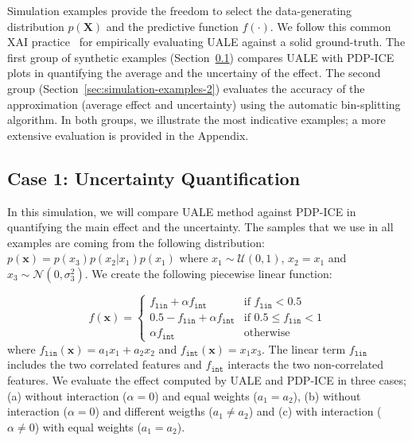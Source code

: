 \documentclass[twoside]{article}
\begin{document}
Simulation examples provide the freedom to select the data-generating
distribution \(p(\mathbf{X})\) and the predictive function
\(f(\cdot)\). We follow this common XAI
practice~\citep{aas2021explaining, herbinger2022repid} for empirically
evaluating UALE against a solid ground-truth. The first group of
synthetic examples (Section~\ref{sec:simulation-examples-1}) compares
UALE with PDP-ICE plots in quantifying the average and the uncertainy
of the effect. The second group
(Section~\ref{sec:simulation-examples-2}) evaluates the accuracy of
the approximation (average effect and uncertainty) using the automatic
bin-splitting algorithm. In both groups, we illustrate the most
indicative examples; a more extensive evaluation is provided in the
Appendix.

\subsection{Case 1: Uncertainty Quantification}
\label{sec:simulation-examples-1}

In this simulation, we will compare UALE method against PDP-ICE in
quantifying the main effect and the uncertainty. The samples that we
use in all examples are coming from the following distribution:
\(p(\mathbf{x}) = p(x_3)p(x_2|x_1)p(x_1)\) where
\(x_1 \sim \mathcal{U}(0,1)\), \(x_2 = x_1\) and
\(x_3 \sim \mathcal{N}(0, \sigma_3^2)\). We create the following
piecewise linear function:


\begin{equation}
  \label{eq:synth-ex-1-function}
  f(\mathbf{x}) = \begin{cases}
                    f_{\mathtt{lin}} + \alpha f_{\mathtt{int}} & \text{if $f_{\mathtt{lin}} < 0.5$ }\\
                    0.5 - f_{\mathtt{lin}} + \alpha f_{\mathtt{int}} & \text{if $0.5 \leq f_{\mathtt{lin}} < 1$}\\
                    \alpha f_{\mathtt{int}} &\text{otherwise}
                  \end{cases}
\end{equation}
%
where \(f_{\mathtt{lin}}(\mathbf{x}) = a_1 x_1 + a_2 x_2\) and
\(f_{\mathtt{int}}(\mathbf{x}) = x_1x_3\). The linear term
\(f_{\mathtt{lin}}\) includes the two correlated features and
\(f_{\mathtt{int}}\) interacts the two non-correlated features.  We
evaluate the effect computed by UALE and PDP-ICE in three cases; (a)
without interaction (\(\alpha=0\)) and equal weights (\(a_1=a_2\)),
(b) without interaction (\(\alpha=0\)) and different weigths
(\( a_1 \neq a_2 \)) and (c) with interaction (\(\alpha \neq 0\)) with
equal weights (\(a_1=a_2\)).
\end{document}
